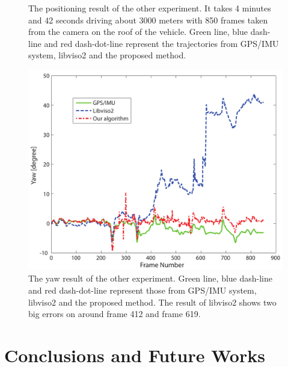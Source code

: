 \documentclass[letterpaper, 10 pt, conference]{ieeeconf}  %
\begin{document}
\begin{figure}[t]
\begin{minipage}[t]{0.48\linewidth}
    \label{fig:another_T_result}
  \end{minipage}%
\caption{The positioning result of the other experiment. It takes 4 minutes and 42 seconds driving about 3000 meters with 850 frames taken from the camera on the roof of the vehicle. Green line, blue dash-line and red dash-dot-line represent the trajectories from GPS/IMU system, libviso2 and the proposed method.}
\label{fig:another_result}
\end{figure}

\begin{figure}[t]
\centering
\includegraphics[width=0.9\linewidth]{source//Final//R_result_Frame200_1049.pdf}
\caption{The yaw result of the other experiment. Green line, blue dash-line and red dash-dot-line represent those from GPS/IMU system, libviso2 and the proposed method. The result of libviso2 shows two big errors on around frame 412 and frame 619.}
\label{fig:another_rotation_result}
\end{figure}

\section{Conclusions and Future Works}
\label{sec_conclusion}
\end{document}
